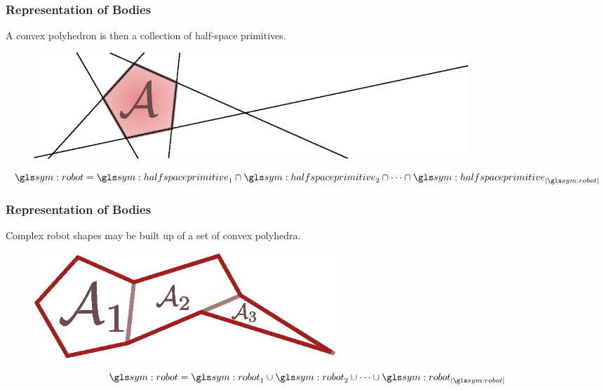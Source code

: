 \documentclass{beamer}
\begin{document}
		\begin{frame}
			\frametitle{Representation of Bodies}

			A convex polyhedron is then a collection of half-space primitives.

			\begin{figure}[h]
				\includegraphics[height=4cm]{object_primitives_3}
			\end{figure}

			\begin{equation}
				\robot =
					\halfspaceprimitive_1 \cap \halfspaceprimitive_2 \cap \cdots \cap
					\halfspaceprimitive_{\cardinality{\robot}}
					\label{eq:convex_robot}
			\end{equation}

		\end{frame}

		\begin{frame}

			\frametitle{Representation of Bodies}

			Complex robot shapes may be built up of a set of convex polyhedra.

			\begin{figure}[h]
				\includegraphics[height=4cm]{object_primitives_4}
			\end{figure}

			\begin{equation}
				\robot =
					\robot_1 \cup \robot_2 \cup \cdots \cup \robot_{\cardinality{\robot}}
					\label{eq:non_convex_robot}
			\end{equation}

		\end{frame}
\end{document}
